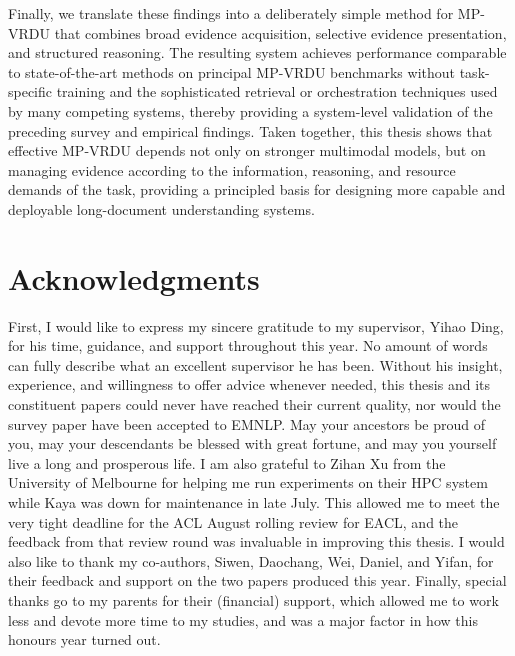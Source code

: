 \documentclass[11pt,twoside,openany]{report}
\begin{document}
Finally, we translate these findings into a deliberately simple method for MP-VRDU that combines broad evidence acquisition, selective evidence presentation, and structured reasoning. The resulting system achieves performance comparable to state-of-the-art methods on principal MP-VRDU benchmarks without task-specific training and the sophisticated retrieval or orchestration techniques used by many competing systems, thereby providing a system-level validation of the preceding survey and empirical findings. Taken together, this thesis shows that effective MP-VRDU depends not only on stronger multimodal models, but on managing evidence according to the information, reasoning, and resource demands of the task, providing a principled basis for designing more capable and deployable long-document understanding systems.

\thispagestyle{empty}

\clearpage
{}

\section*{Acknowledgments}
First, I would like to express my sincere gratitude to my supervisor, Yihao Ding, for his time, guidance, and support throughout this year. No amount of words can fully describe what an excellent supervisor he has been. Without his insight, experience, and willingness to offer advice whenever needed, this thesis and its constituent papers could never have reached their current quality, nor would the survey paper have been accepted to EMNLP. May your ancestors be proud of you, may your descendants be blessed with great fortune, and may you yourself live a long and prosperous life. I am also grateful to Zihan Xu from the University of Melbourne for helping me run experiments on their HPC system while Kaya was down for maintenance in late July. This allowed me to meet the very tight deadline for the ACL August rolling review for EACL, and the feedback from that review round was invaluable in improving this thesis. I would also like to thank my co-authors, Siwen, Daochang, Wei, Daniel, and Yifan, for their feedback and support on the two papers produced this year. Finally, special thanks go to my parents for their (financial) support, which allowed me to work less and devote more time to my studies, and was a major factor in how this honours year turned out.
\end{document}
